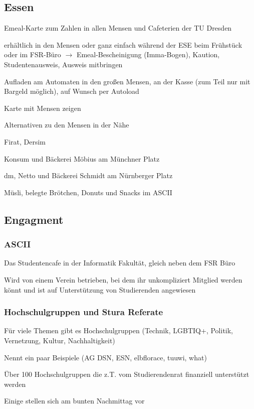 \documentclass[a4paper,12pt]{report}
\begin{document}
\subsection{Essen}
\begin{itemize*}
	\item Emeal-Karte zum Zahlen in allen Mensen und Cafeterien der TU Dresden
	\item erhältlich in den Mensen oder ganz einfach während der ESE beim Frühstück oder im FSR-Büro
	$\rightarrow$ Emeal-Bescheinigung (Imma-Bogen),  Kaution, Studentenausweis, Ausweis mitbringen
	\item Aufladen am Automaten in den großen Mensen, an der Kasse (zum Teil nur mit Bargeld möglich), auf Wunsch per Autoload
	\item Karte mit Mensen zeigen
	\item Alternativen zu den Mensen in der Nähe
	\begin{itemize*}
		\item Firat, Dersim
		\item Konsum und Bäckerei Möbius am Münchner Platz
		\item dm, Netto und Bäckerei Schmidt am Nürnberger Platz
		\item Müsli, belegte Brötchen, Donuts und Snacks im ASCII
	\end{itemize*}
\end{itemize*}

\subsection{Engagment}

\subsubsection{ASCII}
\begin{itemize*}
	\item Das Studentencafe in der Informatik Fakultät, gleich neben dem FSR Büro
	\item Wird von einem Verein betrieben, bei dem ihr unkompliziert Mitglied werden könnt und ist auf Unterstützung von Studierenden angewiesen
\end{itemize*}

\subsubsection{Hochschulgruppen und Stura Referate}
\begin{itemize*}
	\item Für viele Themen gibt es Hochschulgruppen (Technik, LGBTIQ+, Politik, Vernetzung, Kultur, Nachhaltigkeit)
	\item Nennt ein paar Beispiele (AG DSN, ESN, elbflorace, tuuwi, what)
	\item Über 100 Hochschulgruppen die z.T. vom Studierendenrat finanziell unterstützt werden
	\item Einige stellen sich am bunten Nachmittag vor
\end{itemize*}
\end{document}
